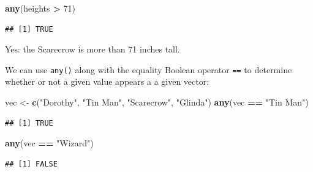 \documentclass[]{book}
\makeatletter
\newenvironment{Shaded}{\begin{snugshade}}{\end{snugshade}}
\newcommand{\KeywordTok}[1]{\textcolor[rgb]{0.13,0.29,0.53}{\textbf{#1}}}
\newcommand{\DecValTok}[1]{\textcolor[rgb]{0.00,0.00,0.81}{#1}}
\newcommand{\StringTok}[1]{\textcolor[rgb]{0.31,0.60,0.02}{#1}}
\newcommand{\OperatorTok}[1]{\textcolor[rgb]{0.81,0.36,0.00}{\textbf{#1}}}
\newcommand{\NormalTok}[1]{#1}
\newenvironment{kframe}{%
\medskip{}
\setlength{\fboxsep}{.8em}
 \def\at@end@of@kframe{}%
 \ifinner\ifhmode%
  \def\at@end@of@kframe{\end{minipage}}%
  \begin{minipage}{\columnwidth}%
 \fi\fi%
 \def\FrameCommand##1{\hskip\@totalleftmargin \hskip-\fboxsep
 \colorbox{shadecolor}{##1}\hskip-\fboxsep
     \hskip-\linewidth \hskip-\@totalleftmargin \hskip\columnwidth}%
 \MakeFramed {\advance\hsize-\width
   \@totalleftmargin\z@ \linewidth\hsize
   \@setminipage}}%
 {\par\unskip\endMakeFramed%
 \at@end@of@kframe}
\renewenvironment{Shaded}{\begin{kframe}}{\end{kframe}}
\theoremstyle{definition}
\theoremstyle{definition}
\theoremstyle{definition}
\theoremstyle{remark}
\makeatother
\begin{document}
\begin{Shaded}
\begin{Highlighting}[]
\KeywordTok{any}\NormalTok{(heights }\OperatorTok{>}\StringTok{ }\DecValTok{71}\NormalTok{)}
\end{Highlighting}
\end{Shaded}

\begin{verbatim}
## [1] TRUE
\end{verbatim}

Yes: the Scarecrow is more than 71 inches tall.

We can use \texttt{any()} along with the equality Boolean operator
\texttt{==} to determine whether or not a given value appears a a given
vector:

\begin{Shaded}
\begin{Highlighting}[]
\NormalTok{vec <-}\StringTok{ }\KeywordTok{c}\NormalTok{(}\StringTok{"Dorothy"}\NormalTok{, }\StringTok{"Tin Man"}\NormalTok{, }\StringTok{"Scarecrow"}\NormalTok{, }\StringTok{"Glinda"}\NormalTok{)}
\KeywordTok{any}\NormalTok{(vec }\OperatorTok{==}\StringTok{ "Tin Man"}\NormalTok{)}
\end{Highlighting}
\end{Shaded}

\begin{verbatim}
## [1] TRUE
\end{verbatim}

\begin{Shaded}
\begin{Highlighting}[]
\KeywordTok{any}\NormalTok{(vec }\OperatorTok{==}\StringTok{ "Wizard"}\NormalTok{)}
\end{Highlighting}
\end{Shaded}

\begin{verbatim}
## [1] FALSE
\end{verbatim}
\end{document}

